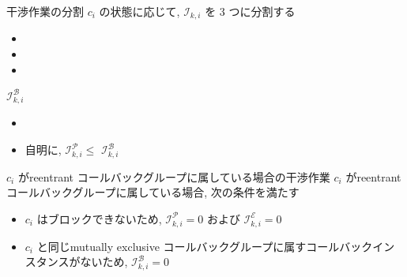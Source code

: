 \begin{frame}{干渉作業の分割}
    $c_{i}$ の状態に応じて, $\mathcal{I}_{k, i}$ を 3 つに分割する
    \begin{itemize}
        \item {}
        \item {}
        \item {}
    \end{itemize}
\end{frame}

\begin{frame}{$\mathcal{I}_{k, i}^{\mathcal{B}}$}
    \begin{itemize}
        \item \desc{$\mathcal{I}_{k, i}^{\mathcal{B}}$}{\\$c_{i}$ がブロックされているかどうかに関係なく, $c_{i}$ と同じmutually exclusive コールバックグループに属す $\mathcal{C}_{k}$ のコールバックインスタンスが $\left[r_{i}, s_{i}\right)$ に実行された合計時間}
        \item 自明に, $\mathcal{I}_{k, i}^{\mathcal{P}} \leq$  $\mathcal{I}_{k, i}^{\mathcal{B}}$
    \end{itemize}
\end{frame}

\begin{frame}{$c_{i}$ がreentrant コールバックグループに属している場合の干渉作業}
    $c_{i}$ がreentrant コールバックグループに属している場合, 次の条件を満たす
    \begin{itemize}
        \item  $c_{i}$ はブロックできないため, $\mathcal{I}_{k, i}^{\mathcal{P}}=0$ および $\mathcal{I}_{k, i}^{\mathcal{E}}=0$

        \item  $c_{i}$ と同じmutually exclusive コールバックグループに属すコールバックインスタンスがないため, $\mathcal{I}_{k, i}^{\mathcal{B}}=0$
    \end{itemize}
\end{frame}

